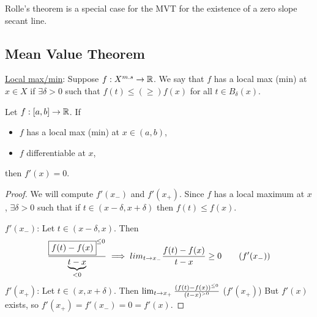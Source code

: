 \documentclass[]{article}
\begin{document}
\begin{remark}
	Rolle's theorem is a special case for the MVT for the existence of a zero slope secant line.
\end{remark}

\subsection{Mean Value Theorem}
\ul{Local max/min}: Suppose $f:X^{m.s}\ra\mb R$. We say that $f$ has a local max (min) at $x\in X$ if $\exists \delta>0$ such that $f(t)\leq (\geq) f(x)$ for all $t\in B_\delta(x)$.
\begin{theorem}
	\label{thm-5-8}
	Let $f:[a,b]\ra\mb R$. If
	\begin{itemize}
		\item $f$ has a local max (min) at $x\in(a,b)$,
		\item $f$ differentiable at $x$,
	\end{itemize}
	then $f'(x)=0$.
\end{theorem}
\begin{proof}
	We will compute $f'(x_-)$ and $f'(x_+)$.
	Since $f$ has a local maximum at $x$, $\exists\delta>0$ such that if $t\in(x-\delta,x+\delta)$ then $f(t)\leq f(x)$.

	$f'(x_-)$: Let $t\in(x-\delta,x)$. Then
	\begin{align*}
		\frac{\fbox{$f(t)-f(x)$}^{\leq 0}}{\ub{<0}{t-x}} \implies lim_{t\ra x_-} \frac{f(t)-f(x)}{t-x}\geq 0 \qquad (f'(x_-))
	\end{align*}
	$f'(x_+)$: Let $t\in(x,x+\delta)$. Then $\lim_{t\ra x_+} \frac{(f(t)-f(x))^{\leq 0}}{(t-x)^{>0}}$ ($f'(x_+)$)
	But $f'(x)$ exists, so $f'(x_+) = f'(x_-) = 0 = f'(x)$.
\end{proof}
\end{document}
